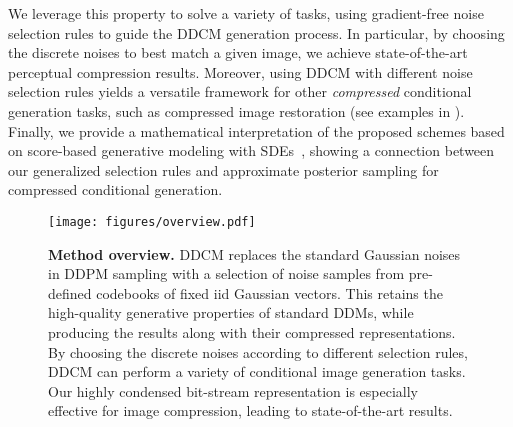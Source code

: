 We leverage this property to solve a variety of tasks, using gradient-free noise selection rules to guide the DDCM generation process.
In particular, by choosing the discrete noises to best match a given image, we achieve state-of-the-art perceptual compression results.
Moreover, using DDCM with different noise selection rules yields a versatile framework for other \emph{compressed} conditional generation tasks, such as compressed image restoration (see examples in ).
Finally, we provide a mathematical interpretation of the proposed schemes based on score-based generative modeling with SDEs~\citep{song2020score}, showing a connection between our generalized selection rules and approximate posterior sampling for compressed conditional generation.



\begin{figure*}[t]
    \centering
    \texttt{[image: figures/overview.pdf]}
    \caption{\textbf{Method overview.} 
    DDCM replaces the standard Gaussian noises in DDPM sampling with a selection of noise samples from pre-defined codebooks of fixed iid Gaussian vectors.
    This retains the high-quality generative properties of standard DDMs, while producing the results along with their compressed representations.
    By choosing the discrete noises according to different selection rules, DDCM can perform a variety of conditional image generation tasks. 
    Our highly condensed bit-stream representation is especially effective for image compression, leading to state-of-the-art results.
    }
    \label{fig:overview}
\end{figure*}

